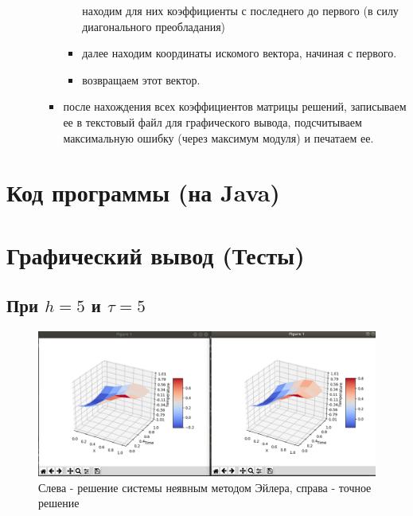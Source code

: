 \documentclass[12pt,a4paper]{scrartcl}
\begin{document}
\begin{itemize}
\begin{itemize}
\begin{itemize}
\begin{itemize}
                находим для них коэффициенты с последнего до первого
                (в силу диагонального преобладания)
                \item далее находим координаты искомого вектора, начиная с первого.
                \item возвращаем этот вектор.
            \end{itemize}
            \item после нахождения всех коэффициентов матрицы
            решений, записываем ее в текстовый файл для графического
            вывода, подсчитываем максимальную ошибку (через
            максимум модуля) и печатаем ее.
        \end{itemize}
    \end{itemize}
\end{itemize}

\section{Код программы (на Java)}



\newpage

\section{Графический вывод (Тесты)}

\subsection*{При $h = 5$ и $\tau = 5$} 
\begin{figure}[h!]
    \centering
    \includegraphics[width=14cm]{heat_equation_implicit_Euler/images/t5h5.png}
    \caption{Слева - решение системы неявным методом Эйлера,
                справа - точное решение}
\end{figure}
\end{document}
